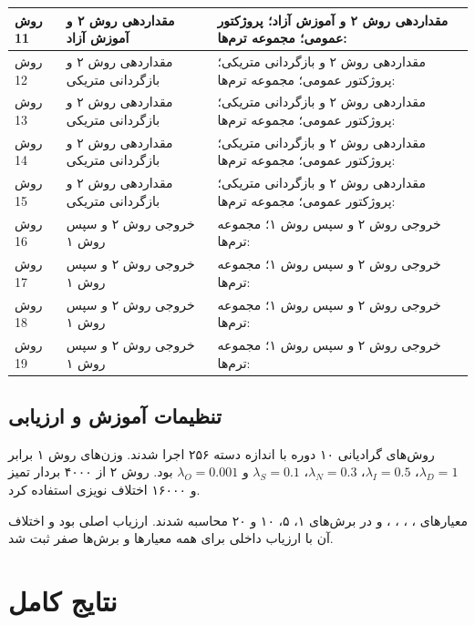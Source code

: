 \documentclass[a4paper,12pt]{article}
\begin{document}
\begin{longtable}{|C{2.3cm}|C{5.3cm}|C{9.0cm}|}
\hline
روش 11 & مقداردهی روش ۲ و آموزش آزاد & مقداردهی روش ۲ و آموزش آزاد؛ پروژکتور عمومی؛ مجموعه ترم‌ها:  \\
\hline
روش 12 & مقداردهی روش ۲ و بازگردانی متریکی & مقداردهی روش ۲ و بازگردانی متریکی؛ پروژکتور عمومی؛ مجموعه ترم‌ها:  \\
\hline
روش 13 & مقداردهی روش ۲ و بازگردانی متریکی & مقداردهی روش ۲ و بازگردانی متریکی؛ پروژکتور عمومی؛ مجموعه ترم‌ها:  \\
\hline
روش 14 & مقداردهی روش ۲ و بازگردانی متریکی & مقداردهی روش ۲ و بازگردانی متریکی؛ پروژکتور عمومی؛ مجموعه ترم‌ها:  \\
\hline
روش 15 & مقداردهی روش ۲ و بازگردانی متریکی & مقداردهی روش ۲ و بازگردانی متریکی؛ پروژکتور عمومی؛ مجموعه ترم‌ها:  \\
\hline
روش 16 &  خروجی روش ۲ و سپس روش ۱ &  خروجی روش ۲ و سپس روش ۱؛ مجموعه ترم‌ها:  \\
\hline
روش 17 &  خروجی روش ۲ و سپس روش ۱ &  خروجی روش ۲ و سپس روش ۱؛ مجموعه ترم‌ها:  \\
\hline
روش 18 &  خروجی روش ۲ و سپس روش ۱ &  خروجی روش ۲ و سپس روش ۱؛ مجموعه ترم‌ها:  \\
\hline
روش 19 &  خروجی روش ۲ و سپس روش ۱ &  خروجی روش ۲ و سپس روش ۱؛ مجموعه ترم‌ها:  \\
\hline
\end{longtable}

\subsection{تنظیمات آموزش و ارزیابی}
روش‌های گرادیانی ۱۰ دوره با اندازه دسته ۲۵۶ اجرا شدند. وزن‌های روش ۱ برابر $\lambda_D=1$، $\lambda_I=0.5$، $\lambda_N=0.3$، $\lambda_S=0.1$ و $\lambda_O=0.001$ بود. روش ۲ از ۴۰۰۰ بردار تمیز و ۱۶۰۰۰ اختلاف نویزی استفاده کرد.

معیارهای ، ، ، ،  و  در برش‌های ۱، ۵، ۱۰ و ۲۰ محاسبه شدند. ارزیاب اصلی  بود و اختلاف آن با ارزیاب داخلی برای همه معیارها و برش‌ها صفر ثبت شد.

\section{نتایج کامل }
\end{document}
